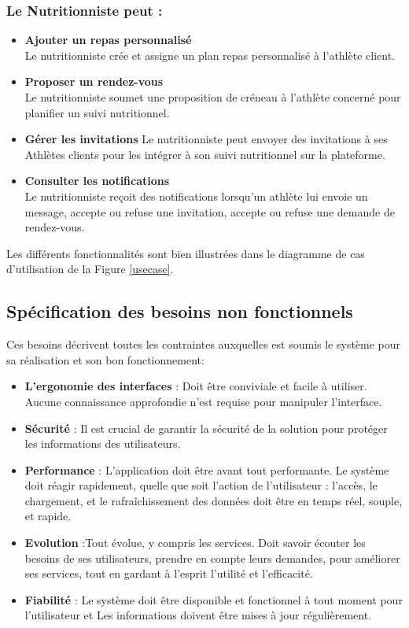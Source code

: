﻿\documentclass[a4paper,12pt]{report}
\begin{document}
\subsubsection*{Le Nutritionniste peut :}
\begin{itemize}
   
    \item \textbf{Ajouter un repas personnalisé} \\
    Le nutritionniste crée et assigne un plan 
    repas personnalisé à l'athlète client.
    \item \textbf{Proposer un rendez-vous} \\
    Le nutritionniste soumet une proposition de créneau 
    à l'athlète concerné pour planifier un suivi nutritionnel.
    \item \textbf{Gérer les invitations} 
    Le nutritionniste peut envoyer des invitations à ses 
    Athlètes clients pour les intégrer à son suivi nutritionnel sur la plateforme.
    \item \textbf{Consulter les notifications} \\
    Le nutritionniste reçoit des notifications lorsqu'un athlète lui envoie un message, accepte ou refuse une invitation, accepte ou refuse une demande de rendez-vous.
\end{itemize}

Les différents fonctionnalités sont bien illustrées dans le diagramme de cas d'utilisation de la Figure \ref{usecase}.
\subsection{Spécification des besoins non fonctionnels}
Ces besoins décrivent toutes les contraintes auxquelles est soumis le système pour sa réalisation et son bon fonctionnement:

\begin{itemize}
    \item \textbf{L'ergonomie des interfaces} : Doit être conviviale et facile à utiliser. 
    Aucune connaissance approfondie n'est requise pour manipuler l'interface.
    \item \textbf{Sécurité }: Il est crucial de garantir la sécurité de la solution pour protéger les informations des utilisateurs.
   \item \textbf{Performance } : L'application doit être avant tout performante. Le système doit réagir rapidement, 
    quelle que soit l'action de l'utilisateur : l'accès, le chargement, et le rafraîchissement des données doit être en temps réel, souple, et rapide. 
   
    \item \textbf{Evolution } :Tout évolue, y compris les services. Doit savoir écouter les besoins de ses utilisateurs, prendre en compte leurs demandes,
     pour améliorer ses services, tout en gardant à l'esprit l'utilité et l'efficacité.
     \item \textbf{Fiabilité} : Le système doit être disponible et fonctionnel à tout moment pour l'utilisateur et Les informations doivent être mises à jour régulièrement.
\end{itemize}
\end{document}
